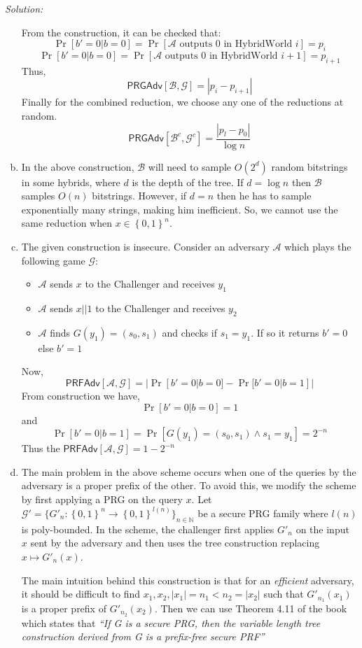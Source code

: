 \documentclass[a4paper, 11pt]{article}
\newenvironment{solution}
    {\textit{Solution:}}
    {\clearpage}
\newcommand{\bit}{\left\{0, 1\right\}}
\newcommand{\prf}{\mathsf{PRFAdv}}
\newcommand{\prg}{\mathsf{PRGAdv}}
\newcommand{\N}{\mathbb{N}}
\newcommand{\calA}{\mathcal{A}}
\newcommand{\calB}{\mathcal{B}}
\newcommand{\calG}{\mathcal{G}}
\begin{document}
\begin{solution}
\begin{enumerate}[(a)]
                  From the construction, it can be checked that:
                  $$\Pr[b'=0|b=0]=\Pr[\calA\text{ outputs 0 in HybridWorld } i]=p_{i}$$
                  $$\Pr[b'=0|b=0]=\Pr[\calA\text{ outputs 0 in HybridWorld } i+1]=p_{i+1}$$
                  Thus,
                  $$\prg[\calB,\calG]=|p_{i}-p_{i+1}|$$
                  Finally for the combined reduction, we choose any one of the reductions at random.
                  $$\prg[\calB^c,\calG^c]=\frac{|p_{l}-p_{0}|}{\log n}$$
        \item In the above construction, $\calB$ will need to sample $O(2^d)$ random bitstrings in some hybrids, where $d$ is the depth of the tree. If $d=\log n$ then $\calB$ samples $O(n)$ bitstrings. However, if $d=n$ then he has to sample exponentially many strings, making him inefficient. So, we cannot use the same reduction when $x\in\bit^n$.
        \item The given construction is insecure. Consider an adversary $\calA$ which plays the following game $\calG$:
        \begin{itemize}
            \item $\calA$ sends $x$ to the Challenger and receives $y_1$
            \item $\calA$ sends $x||1$ to the Challenger and receives $y_2$
            \item $\calA$ finds $G(y_1)=(s_0,s_1)$ and checks if $s_1=y_1$. If so it returns $b'=0$ else $b'=1$
        \end{itemize}
        Now,
        $$\prf[\calA,\calG]=|\Pr[b'=0|b=0]-\Pr[b'=0|b=1]|$$
        From construction we have,
        $$\Pr[b'=0|b=0]=1$$
        and
        $$\Pr[b'=0|b=1]=\Pr[G(y_1)=(s_0,s_1)\wedge s_1=y_1]=2^{-n}$$
        Thus the $\prf[\calA,\calG]=1-2^{-n}$
        \item The main problem in the above scheme occurs when one of the queries by the adversary is a proper prefix of the other. To avoid this, we modify the scheme by first applying a PRG on the query $x$. Let $\calG' = \{G'_n: \bit^n\rightarrow\bit^{l(n)}\}_{n\in\N}$ be a secure PRG family where $l(n)$ is poly-bounded. In the scheme, the challenger first applies $G'_n$ on the input $x$ sent by the adversary and then uses the tree construction replacing $x\mapsto G'_n(x)$.
        
        The main intuition behind this construction is that for an \textit{efficient} adversary, it should be difficult to find $x_1,x_2, |x_1|=n_1<n_2=|x_2|$ such that $G'_{n_1}(x_1)$ is a proper prefix of $G'_{n_2}(x_2)$. Then we can use Theorem 4.11 of the book which states that \textit{``If G is a secure PRG, then the variable length tree construction derived from G is a prefix-free secure PRF''}
    \end{enumerate}
\end{solution}
\end{document}
